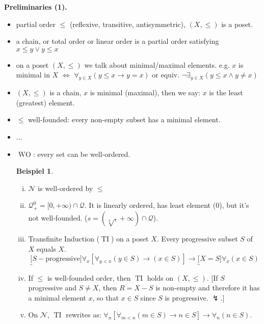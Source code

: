 \documentclass[headsepline=true,DIV=11]{scrartcl}
\theoremstyle{definition}
\newtheorem*{example}{Beispiel}
\newcommand{\WO}{\operatorname{WO}}
\newcommand{\TI}{\operatorname{TI}}
\begin{document}
{\bf Preliminaries (1).}
\begin{itemize}
	\item partial order $\le$ (reflexive, transitive, antisymmetric), $(X,\le)$ is a poset.
	\item a chain, or total order or linear order is a partial order satisfying $x\le y\lor y\le x$
	\item on a poset $(X,\le)$ we talk about minimal/maximal elements. e.g. $x$ is minimal in $X$ $\iff$ $\forall_{y\in X}(y\le x\to y=x)$
		or equiv. $\neg \exists_{y\in X}(y\le x \land y\neq x)$
	\item $(X,\le)$ is a chain, $x$ is minimal (maximal), then we say: $x$ is the least (greatest) element.
	\item $\le$ well-founded: every non-empty subset has a minimal element.
	\item ...
	\item $\WO$: every set can be well-ordered.
	\begin{example}
		\begin{enumerate}[(i)]
			\item $\mathcal N$ is well-ordered by $\le$
			\item $\mathcal Q^0_+ = [0,+\infty)\cap \mathcal Q$. It is linearly ordered, has least element (0), but it's not well-founded. 
				($s=(\sqrt[2], +\infty)\cap \mathcal Q$).
			\item Transfinite Induction ($\TI$) on a poset $X$. Every progressive subset $S$ of $X$ equals $X$.
				\[\underbrace[S-\text{progressive}]{\forall_x[\forall_{y<x}(y\in S)\to(x\in S)]}\to \underbrace[X=S]{\forall_x(x\in S)} \]
			\item If $\le$ is well-founded order, then $\TI$ holds on $(X,\le)$.
			[If $S$ progressive and $S\neq X$, then $R=X-S$ is non-empty and therefore it has a minimal element $x$, so that $x\in S$ since $S$ is progressive. $\lightning$.]
			\item On $\mathcal N$, $\TI$ rewrites as: $\forall_n[\forall_{m<n}(m\in S)\to n\in S]\to \forall_n(n\in S)$.
		\end{enumerate}
	\end{example}
	\end{itemize}
\end{document}
